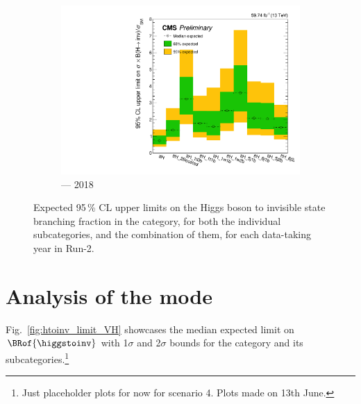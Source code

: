 \begin{figure}[htbp]
    \begin{subfigure}[b]{0.45\textwidth}
        \includegraphics[width=\textwidth]{figures/limits/ttH/limit_2018_ttH_Scenario4.pdf}
        \caption{\ttH --- 2018}
    \end{subfigure}
    \caption[Expected 95\,\% CL upper limits on the Higgs boson to invisible state branching fraction in the \ttH category, for both the individual subcategories, and the combination of them, for each data-taking year in Run-2]{Expected 95\,\% CL upper limits on the Higgs boson to invisible state branching fraction in the \ttH category, for both the individual subcategories, and the combination of them, for each data-taking year in Run-2.}
    \label{fig:htoinv_limit_ttH}
\end{figure}




\section{Analysis of the \texorpdfstring{\VH}{VH} mode}
\label{sec:htoinv_analysis_VH}


Fig.~\ref{fig:htoinv_limit_VH} showcases the median expected limit on $\BRof{\higgstoinv}$ with 1$\sigma$ and 2$\sigma$ bounds for the \VH category and its subcategories.\footnote{Just placeholder plots for now for scenario 4. Plots made on 13th June.}

